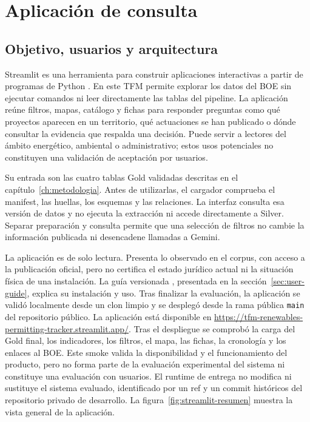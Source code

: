 \chapter{Aplicación de consulta}
\label{ch:aplicacion}
\section{Objetivo, usuarios y arquitectura}
Streamlit es una herramienta para construir aplicaciones interactivas a partir
de programas de Python \cite{streamlit_basicconcepts_2026}.
En este TFM permite explorar los datos del BOE sin ejecutar comandos ni leer
directamente las tablas del pipeline. La aplicación reúne filtros, mapas,
catálogo y fichas para responder preguntas como qué proyectos aparecen en un
territorio, qué actuaciones se han publicado o dónde consultar la evidencia
que respalda una decisión. Puede servir a lectores del ámbito energético,
ambiental o administrativo; estos usos potenciales no constituyen una
validación de aceptación por usuarios.

Su entrada son las cuatro tablas Gold validadas descritas en el
capítulo~\ref{ch:metodologia}. Antes de utilizarlas, el cargador comprueba
el manifest, las huellas, los esquemas y las relaciones. La interfaz consulta
esa versión de datos y no ejecuta la extracción ni accede directamente a
Silver. Separar preparación y consulta permite que una selección de filtros
no cambie la información publicada ni desencadene llamadas a Gemini.

La aplicación es de solo lectura. Presenta lo observado en el corpus, con
acceso a la publicación oficial, pero no certifica el estado jurídico actual
ni la situación física de una instalación. La guía versionada
, presentada en la sección~\ref{sec:user-guide},
explica su instalación y uso. Tras finalizar la evaluación, la aplicación se
validó localmente desde un clon limpio y se desplegó desde la rama
pública \texttt{main} del repositorio público. La aplicación está disponible en
\url{https://tfm-renewables-permitting-tracker.streamlit.app/}. Tras el
despliegue se comprobó la carga del Gold final, los indicadores, los filtros,
el mapa, las fichas, la cronología y los enlaces al BOE. Este smoke valida la
disponibilidad y el funcionamiento del producto, pero no forma parte de la
evaluación experimental del sistema ni constituye una evaluación con usuarios.
El runtime de entrega no modifica ni sustituye el sistema evaluado,
identificado por un ref y un commit históricos del repositorio privado de
desarrollo. La figura~\ref{fig:streamlit-resumen} muestra la vista general de
la aplicación.

